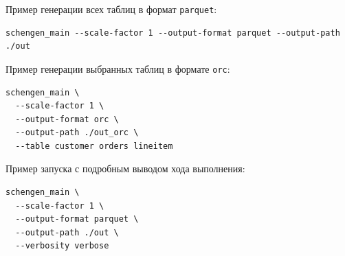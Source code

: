 Пример генерации всех таблиц в формат \texttt{parquet}:

\begin{verbatim}
schengen_main --scale-factor 1 --output-format parquet --output-path ./out
\end{verbatim}

Пример генерации выбранных таблиц в формате \texttt{orc}:

\begin{verbatim}
schengen_main \
  --scale-factor 1 \
  --output-format orc \
  --output-path ./out_orc \
  --table customer orders lineitem
\end{verbatim}

Пример запуска с подробным выводом хода выполнения:

\begin{verbatim}
schengen_main \
  --scale-factor 1 \
  --output-format parquet \
  --output-path ./out \
  --verbosity verbose
\end{verbatim}
